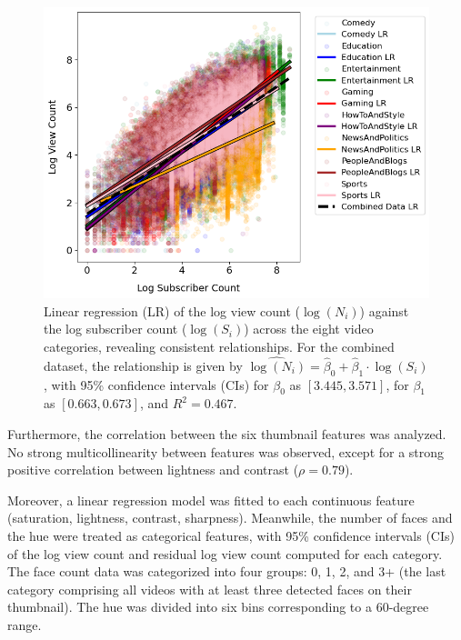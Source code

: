 \documentclass{article}
\begin{document}
\begin{figure}[h]
  \begin{minipage}[t]{0.67\textwidth}
    \vspace{0pt}  %
    \includegraphics[width=\textwidth]{figs/subscriber.png}
  \end{minipage}%
  \hspace{0.05\textwidth}%
  \begin{minipage}[t]{0.27\textwidth}
    \vspace{0pt}  %
    \caption{Linear regression (LR) of the log view count ($\log{(N_i)}$) against the log subscriber count ($\log{(S_i)}$) across the eight video categories, revealing consistent relationships. For the combined dataset, the relationship is given by $\widehat{\log(N_i)} = \hat{\beta}_0 + \hat{\beta}_1 \cdot \log(S_i)$, with 95\% confidence intervals (CIs) for $\beta_0$ as $[3.445, 3.571]$, for $\beta_1$ as $[0.663, 0.673]$, and $R^2 = 0.467$.}
    \label{fig:subscriber}
  \end{minipage}
\end{figure}

Furthermore, the correlation between the six thumbnail features was analyzed. No strong multicollinearity between features was observed, except for a strong positive correlation between lightness and contrast ($\rho=0.79$).

Moreover, a linear regression model was fitted to each continuous feature (saturation, lightness, contrast, sharpness). Meanwhile, the number of faces and the hue were treated as categorical features, with 95\% confidence intervals (CIs) of the log view count and residual log view count computed for each category. The face count data was categorized into four groups: 0, 1, 2, and 3+ (the last category comprising all videos with at least three detected faces on their thumbnail). The hue was divided into six bins corresponding to a 60-degree range.
\end{document}
